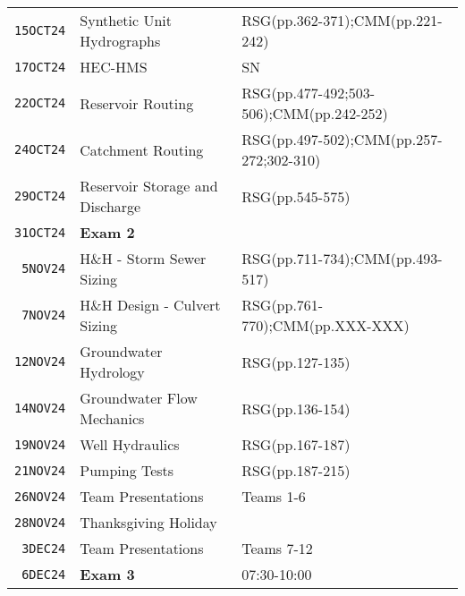 \documentclass[12pt]{article}
\begin{document}
\begin{table}[ht!]
\begin{tabular}{p{0.5in}p{3.0in}p{3.0in}}
\texttt{15OCT24} & Synthetic Unit Hydrographs & RSG(pp.362-371);CMM(pp.221-242) \\ %
\texttt{17OCT24} & HEC-HMS  & SN \\ %
\texttt{22OCT24} & Reservoir Routing &RSG(pp.477-492;503-506);CMM(pp.242-252)  \\ %
\texttt{24OCT24} & Catchment Routing &RSG(pp.497-502);CMM(pp.257-272;302-310)\\ %
\texttt{29OCT24} & Reservoir Storage and Discharge & RSG(pp.545-575)\\ %
\texttt{31OCT24} & \textbf{Exam 2} & \\ %
\texttt{~5NOV24} & H\&H - Storm Sewer Sizing &RSG(pp.711-734);CMM(pp.493-517)  \\ %
\texttt{~7NOV24} & H\&H Design - Culvert Sizing & RSG(pp.761-770);CMM(pp.XXX-XXX)  \\ %
\texttt{12NOV24} & Groundwater Hydrology & RSG(pp.127-135)  \\ %
\texttt{14NOV24} & Groundwater Flow Mechanics & RSG(pp.136-154) \\ %
\texttt{19NOV24} & Well Hydraulics & RSG(pp.167-187) \\ %
\texttt{21NOV24} & Pumping Tests & RSG(pp.187-215) \\ %
\texttt{26NOV24} & Team Presentations &  Teams 1-6\\ %
\texttt{28NOV24} & Thanksgiving Holiday &    \\ %
\texttt{~3DEC24} & Team Presentations & Teams 7-12 \\ %
\texttt{~6DEC24} & \textbf{Exam 3} & 07:30-10:00 \\ %
\hline
   \end{tabular}
   \label{tab:schedule}
\end{table}


\clearpage
\end{document}
